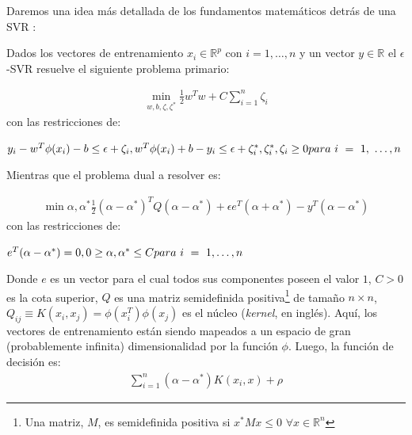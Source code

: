     Daremos una idea más detallada de los fundamentos matemáticos detrás de una
    SVR \cite{svr_tutorial}:

    Dados los vectores de entrenamiento $x_{i} \in \mathbb{R}^{p}$ con $i = 1, \dots ,n$
    y un vector $y \in \mathbb{R}$ el $\epsilon$-SVR resuelve el siguiente problema
    primario:

    \begin{align}
      \min\limits_{w, b, \zeta, \zeta^{*}} \frac{1}{2} w^{T} w + C \sum_{i = 1}^{n} \zeta_{i}
    \end{align}
    con las restricciones de:


    \begin{math}
      y_{i} - w^{T} \phi(x_{i}) - b \leq \epsilon + \zeta_{i}, \\
      w^{T} \phi(x_{i}) + b - y_{i} \leq \epsilon + \zeta^{*}_{i}, \\
            \zeta^{*}_{i}, \zeta_{i} \geq 0 \\
      para\ i\ =\ 1,\ \dots, n
    \end{math}

    Mientras que el problema dual a resolver es:

    \begin{align}
      \min\limits{\alpha, \alpha^{*}} \frac{1}{2} (\alpha - \alpha^{*})^{T}
      Q(\alpha - \alpha^{*}) + \epsilon e^{T} (\alpha + \alpha^{*}) -
      y^{T} (\alpha - \alpha^{*})
    \end{align}
    con las restricciones de:

    \begin{math}
      e^{T} (\alpha - \alpha^{*}) = 0, \\
      0 \geq \alpha, \alpha^{*} \leq C \\
      para\ i\ =\ 1, \dots, n
    \end{math}

  \par Donde $e$ es un vector para el cual todos sus componentes poseen el valor $1$, $C > 0$
    es la cota superior, $Q$ es una matriz semidefinida
    positiva\footnote{Una matriz, $M$, es semidefinida positiva si $x^{*}Mx \leq 0$
    $\forall x \in \mathbb{R}^{n}$} de tamaño $n \times n$,
    $Q_{ij} \equiv K(x_{i}, x_{j}) = \phi(x_{i}^{T})\phi(x_{j})$ es el núcleo
    (\textit{kernel}, en inglés). Aquí, los vectores de entrenamiento están siendo mapeados
    a un espacio de gran (probablemente infinita) dimensionalidad por la función
    $\phi$.
    Luego, la función de decisión es:
    \begin{align}
      \sum_{i = 1}^{n} (\alpha - \alpha^{*})K(x_{i}, x) + \rho
    \end{align}

